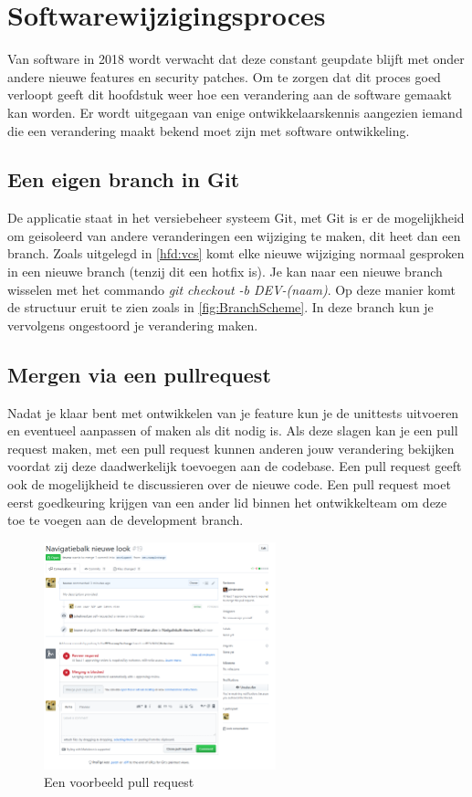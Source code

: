 \chapter{Softwarewijzigingsproces}
Van software in 2018 wordt verwacht dat deze constant geupdate blijft met onder andere nieuwe features en security patches.
Om te zorgen dat dit proces goed verloopt geeft dit hoofdstuk weer hoe een verandering aan de software gemaakt kan worden.
Er wordt uitgegaan van enige ontwikkelaarskennis aangezien iemand die een verandering maakt bekend moet zijn met software ontwikkeling.

\section{Een eigen branch in Git}
De applicatie staat in het versiebeheer systeem Git, met Git is er de mogelijkheid om geisoleerd van andere veranderingen een wijziging te maken, dit heet dan een branch. 
Zoals uitgelegd in \cref{hfd:vcs} komt elke nieuwe wijziging normaal gesproken in een nieuwe branch (tenzij dit een hotfix is).
Je kan naar een nieuwe branch wisselen met het commando \textit{git checkout -b DEV-(naam)}.
Op deze manier komt de structuur eruit te zien zoals in \cref{fig:BranchScheme}.
In deze branch kun je vervolgens ongestoord je verandering maken.

\section{Mergen via een pullrequest}
Nadat je klaar bent met ontwikkelen van je feature kun je de unittests uitvoeren en eventueel aanpassen of maken als dit nodig is.
Als deze slagen kan je een pull request maken, met een pull request kunnen anderen jouw verandering bekijken voordat zij deze daadwerkelijk toevoegen aan de codebase.
Een pull request geeft ook de mogelijkheid te discussieren over de nieuwe code.
Een pull request moet eerst goedkeuring krijgen van een ander lid binnen het ontwikkelteam om deze toe te voegen aan de development branch.
\begin{figure}[h]
	\centering\includegraphics[width=0.6\textwidth]{images/PullRequestExample.png}
	\caption{Een voorbeeld pull request}
\end{figure}

